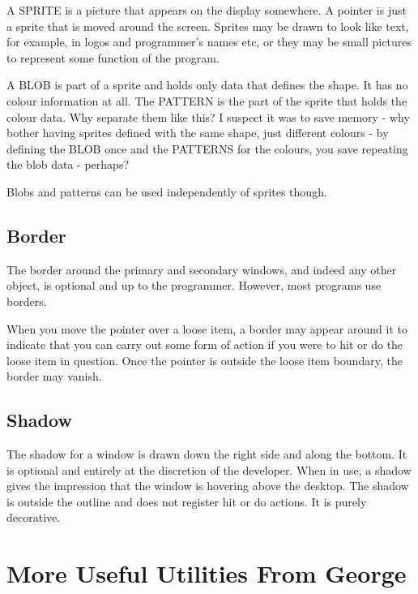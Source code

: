 A SPRITE is a picture that appears on the display somewhere. A
      pointer is just a sprite that is moved around the screen. Sprites may be
      drawn to look like text, for example, in logos and programmer's names
      etc, or they may be small pictures to represent some function of the
      program.

A BLOB is part of a sprite and holds only data that defines the
      shape. It has no colour information at all. The PATTERN is the part of
      the sprite that holds the colour data. Why separate them like this? I
      suspect it was to save memory -{} why bother having sprites defined with
      the same shape, just different colours -{} by defining the BLOB once and
      the PATTERNS for the colours, you save repeating the blob data -{}
      perhaps?

Blobs and patterns can be used independently of sprites
      though.

\subsection{Border}
\label{ch22-border}%

The border around the primary and secondary windows, and indeed
      any other object, is optional and up to the programmer. However, most
      programs use borders.

When you move the pointer over a loose item, a border may appear
      around it to indicate that you can carry out some form of action if you
      were to hit or do the loose item in question. Once the pointer is
      outside the loose item boundary, the border may vanish.

\subsection{Shadow}
\label{ch22-shadow}%

The shadow for a window is drawn down the right side and along the
      bottom. It is optional and entirely at the discretion of the developer.
      When in use, a shadow gives the impression that the window is hovering
      above the desktop. The shadow is outside the outline and does not
      register hit or do actions. It is purely decorative.

\section{More Useful Utilities From George}
\label{ch22-utilities}%

